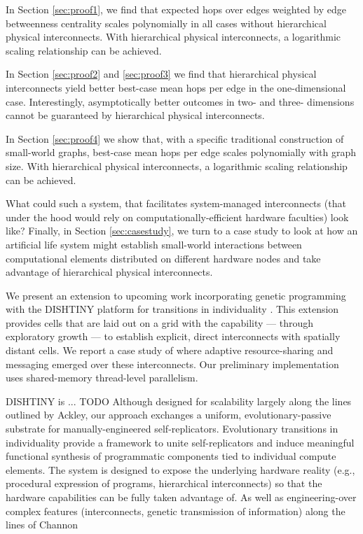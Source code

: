 In Section \ref{sec:proof1}, we find that expected hops over edges weighted by edge betweenness centrality scales polynomially in all cases without hierarchical physical interconnects.
With hierarchical physical interconnects, a logarithmic scaling relationship can be achieved.

In Section \ref{sec:proof2} and \ref{sec:proof3} we find that hierarchical physical interconnects yield better best-case mean hops per edge in the one-dimensional case.
Interestingly, asymptotically better outcomes in two- and three- dimensions cannot be guaranteed by hierarchical physical interconnects.

In Section \ref{sec:proof4} we show that, with a specific traditional construction of small-world graphs, best-case mean hops per edge scales polynomially with graph size.
With hierarchical physical interconnects, a logarithmic scaling relationship can be achieved.

What could such a system, that facilitates system-managed interconnects (that under the hood  would rely on computationally-efficient hardware faculties) look like?
Finally, in Section \ref{sec:casestudy}, we turn to a case study to look at how an artificial life system might establish small-world interactions between computational elements distributed on different hardware nodes and take advantage of hierarchical physical interconnects.

We present an extension to upcoming work incorporating genetic programming with the DISHTINY platform for transitions in individuality \citep{moreno2019toward}.
This extension provides cells that are laid out on a grid with the capability --- through exploratory growth --- to establish explicit, direct interconnects with spatially distant cells.
We report a case study of where adaptive resource-sharing and messaging emerged over these interconnects.
Our preliminary implementation uses shared-memory thread-level parallelism.

DISHTINY is ... TODO
Although designed for scalability largely along the lines outlined by Ackley, our approach exchanges a uniform, evolutionary-passive substrate for manually-engineered self-replicators.
Evolutionary transitions in individuality provide a framework to unite self-replicators and induce meaningful functional synthesis of programmatic components tied to individual compute elements.
The system is designed to expose the underlying hardware reality (e.g., procedural expression of programs, hierarchical interconnects) so that the hardware capabilities can be fully taken advantage of.
As well as engineering-over complex features (interconnects, genetic transmission of information) along the lines of Channon

